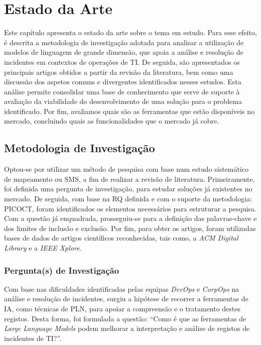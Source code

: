 
\chapter{Estado da Arte} %
\label{chap:Chapter2} %
	Este capítulo apresenta o estado da arte sobre o tema em estudo. Para esse efeito, é descrita a metodologia de investigação adotada para analisar a utilização de modelos de linguagem de grande dimensão, que apoia a análise e resolução de incidentes em contextos de operações de \gls{TI}. De seguida, são apresentados os principais artigos obtidos a partir da revisão da literatura, bem como uma discussão dos aspetos comuns e divergentes identificados nesses estudos. Esta análise permite consolidar uma base de conhecimento que serve de suporte à avaliação da viabilidade do desenvolvimento de uma solução para o problema identificado. Por fim, avaliamos quais são as ferramentas que estão disponíveis no mercado, concluindo quais as funcionalidades que o mercado já cobre.

\section{Metodologia de Investigação}

	Optou-se por utilizar um método de pesquisa com base num estudo sistemático de mapeamento ou \gls{SMS}, a fim de realizar a revisão de literatura. Primeiramente, foi definida uma pergunta de investigação, para estudar soluções já existentes no mercado. De seguida, com base na \gls{RQ} definida e com o suporte da metodologia: \gls{PICOCT}, foram identificados os elementos necessários para estruturar a pesquisa. Com a questão já enquadrada, prosseguiu-se para a definição das palavras-chave e dos limites de inclusão e exclusão. Por fim, para obter os artigos, foram utilizadas bases de dados de artigos científicos reconhecidas, tais como, a \textit{ACM Digital Library} e a \textit{IEEE Xplore}.


	\subsection{Pergunta(s) de Investigação}
		Com base nas dificuldades identificadas pelas equipas \textit{DevOps} e \textit{CorpOps} na análise e resolução de incidentes, surgiu a hipótese de recorrer a ferramentas de \gls{IA}, como técnicas de \gls{PLN}, para apoiar a compreensão e o tratamento destes registos. Desta forma, foi formulada a questão: “Como é que as ferramentas de \textit{Large Language Models} podem melhorar a interpretação e análise de registos de incidentes de TI?”.
		
